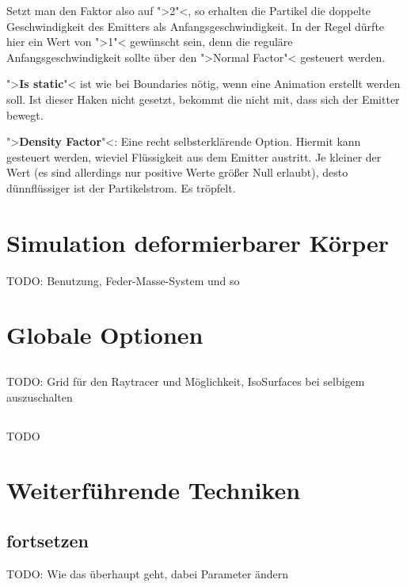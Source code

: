 \documentclass[10pt,DIV=14,a4paper]{scrartcl}
\begin{document}
	Setzt man den Faktor also auf ">2"<, so erhalten die Partikel die
	doppelte Geschwindigkeit des Emitters als Anfangsgeschwindigkeit. In
	der Regel dürfte hier ein Wert von ">1"< gewünscht sein, denn die
	reguläre Anfangsgeschwindigkeit sollte über den ">Normal Factor"<
	gesteuert werden.

	\item ">\textbf{Is static}"< ist wie bei Boundaries nötig, wenn eine
	Animation erstellt werden soll. Ist dieser Haken nicht gesetzt,
	bekommt die \fluidsim nicht mit, dass sich der Emitter bewegt.

	\item ">\textbf{Density Factor}"<: Eine recht selbsterklärende
	Option. Hiermit kann gesteuert werden, wieviel Flüssigkeit aus dem
	Emitter austritt. Je kleiner der Wert (es sind allerdings nur
	positive Werte größer Null erlaubt), desto dünnflüssiger ist der
	Partikelstrom. Es tröpfelt.

\itE




\pagebreak
\section{Simulation deformierbarer Körper}
TODO: Benutzung, Feder-Masse-System und so


\pagebreak
\section{Globale Optionen}

\subsection{}
TODO: Grid für den Raytracer und Möglichkeit, IsoSurfaces bei selbigem
auszuschalten

\subsection{}
TODO



\pagebreak
\section{Weiterführende Techniken}

\subsection{ fortsetzen}
TODO: Wie das überhaupt geht, dabei Parameter ändern
\end{document}
